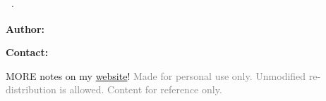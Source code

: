 \begin{titlepage}
    \null\vfill %

    \centering
    \Huge\textbf{\documentname}

    \vspace{0.1cm}
    \Large\textbf{\documenttype\ $\cdot$ \documentdate}

    \vspace{1cm}
    \normalsize\textbf{Author:} \documentauthor

    \normalsize\textbf{Contact:} \documentauthorcontact

    MORE notes on my \href{https://enhancedjax.github.io/#/hkunotes}{website}!
    \vfill %
    \textcolor{gray}{Made for personal use only. Unmodified re-distribution is allowed. Content for reference only.}
\end{titlepage}